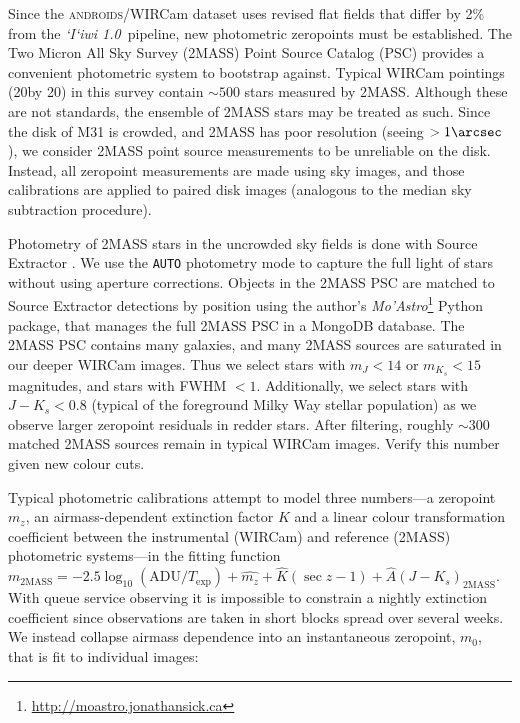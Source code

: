 \documentclass[iop]{emulateapj}
\newcommand{\sw}[1]{\textit{#1}} %
\newcommand{\iiwione}{\sw{`I`iwi 1.0}}
\newcommand{\androids}{\textsc{androids}}
\newcommand{\todo}[1]{\textcolor{BurntOrange}{\textsf{#1}}} %
\begin{document}
Since the \androids/WIRCam dataset uses revised flat fields that differ by 2\% from the \iiwione\ pipeline, new photometric zeropoints must be established.
The Two Micron All Sky Survey (2MASS) Point Source Catalog (PSC) \citep{Skrutskie:2006} provides a convenient photometric system to bootstrap against.
Typical WIRCam pointings (20\arcmin by 20\arcmin) in this survey contain $\sim 500$ stars measured by 2MASS.
Although these are not standards, the ensemble of 2MASS stars may be treated as such.
Since the disk of M31 is crowded, and 2MASS has poor resolution (seeing $> 1\arcsec$), we consider 2MASS point source measurements to be unreliable on the disk.
Instead, all zeropoint measurements are made using sky images, and those calibrations are applied to paired disk images (analogous to the median sky subtraction procedure).

Photometry of 2MASS stars in the uncrowded sky fields is done with Source Extractor \citep{Bertin:1996}.
We use the \texttt{AUTO} photometry mode to capture the full light of stars without using aperture corrections.
Objects in the 2MASS PSC are matched to Source Extractor detections by position using the author's \sw{Mo'Astro}\footnote{\url{http://moastro.jonathansick.ca}} Python package, that manages the full 2MASS PSC in a MongoDB database.
The 2MASS PSC contains many galaxies, and many 2MASS sources are saturated in our deeper WIRCam images.
Thus we select stars with $m_J < 14$ or $m_{K_s} < 15$ magnitudes, and stars with FWHM $<1$\arcsec.
Additionally, we select stars with $J-K_s < 0.8$ (typical of the foreground Milky Way stellar population) as we observe larger zeropoint residuals in redder stars.
After filtering, roughly $\sim 300$ matched 2MASS sources remain in typical WIRCam images.
\todo{Verify this number given new colour cuts}.

Typical photometric calibrations attempt to model three numbers---a zeropoint $m_z$, an airmass-dependent extinction factor $K$ and a linear colour transformation coefficient between the instrumental (WIRCam) and reference (2MASS) photometric systems---in the fitting function $m_\mathrm{2MASS} = -2.5 \log_{10}(\mathrm{ADU}/T_\mathrm{exp}) + \hat{m_z} + \hat{K} (\sec z -1) + \hat{A} (J-K_s)_\mathrm{2MASS}$.
With queue service observing it is impossible to constrain a nightly extinction coefficient since observations are taken in short blocks spread over several weeks.
We instead collapse airmass dependence into an instantaneous zeropoint, $m_0$, that is fit to individual images:
\end{document}
